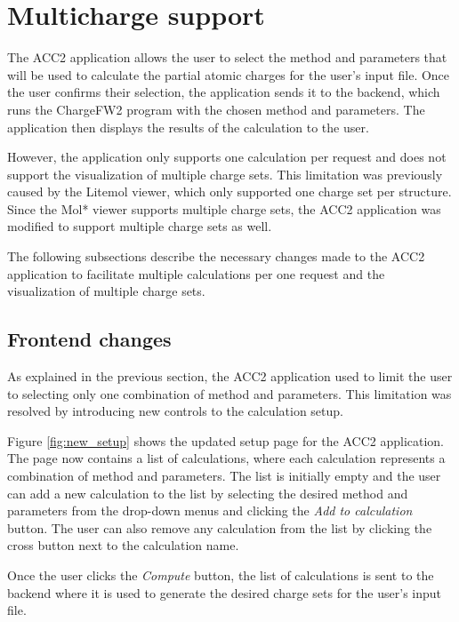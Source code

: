 \documentclass[
  digital,     %
  oneside,     %
  nosansbold,  %
  nocolorbold, %
  lof,         %
  lot,         %
]{fithesis4}
\begin{document}
\section{Multicharge support}
\label{section:multicharge_support}

The ACC2 application allows the user to select the method and parameters that will be used to calculate the partial atomic charges for the user's input file. Once the user confirms their selection, the application sends it to the backend, which runs the ChargeFW2 program with the chosen method and parameters. The application then displays the results of the calculation to the user.

However, the application only supports one calculation per request and does not support the visualization of multiple charge sets. This limitation was previously caused by the Litemol viewer, which only supported one charge set per structure. Since the Mol* viewer supports multiple charge sets, the ACC2 application was modified to support multiple charge sets as well.

The following subsections describe the necessary changes made to the ACC2 application to facilitate multiple calculations per one request and the visualization of multiple charge sets.

\subsection{Frontend changes}

As explained in the previous section, the ACC2 application used to limit the user to selecting only one combination of method and parameters. This limitation was resolved by introducing new controls to the calculation setup.

Figure \ref{fig:new_setup} shows the updated setup page for the ACC2 application. The page now contains a list of calculations, where each calculation represents a combination of method and parameters. The list is initially empty and the user can add a new calculation to the list by selecting the desired method and parameters from the drop-down menus and clicking the \textit{Add to calculation} button. The user can also remove any calculation from the list by clicking the cross button next to the calculation name.

Once the user clicks the \textit{Compute} button, the list of calculations is sent to the backend where it is used to generate the desired charge sets for the user's input file.
\end{document}
